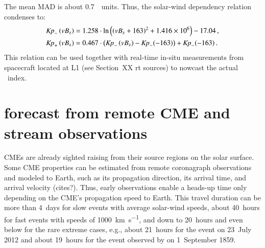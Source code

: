 \begin{figure}
\end{figure}
The mean MAD is about 0.7~\Kp{}~units. Thus, the solar-wind dependency relation condenses to:
\begin{align}
	\text{\textit{Kp}}_-\left(vB_\text{z}\right) &= 1.258 \cdot \ln\left(\left(vB_\text{z} + 163\right)^2 + \num{1.416e6}\right) - 17.04	\,,	\label{eq:kpvsvbz_dependency_function_negative}\\
	\text{\textit{Kp}}_+\left(vB_\text{z}\right) &= 0.467 \cdot \left(\text{\textit{Kp}}_-\left(vB_\text{z}\right) - \text{\textit{Kp}}_-(-163)\right) + \text{\textit{Kp}}_-(-163)	\,.	\label{eq:kpvsvbz_dependency_function_positive}
\end{align}
This relation can be used together with real-time in-situ measurements from spacecraft located at L1 (see Section~XX rt sources) to nowcast the actual \Kp~index.


\section{\Kp{} forecast from remote CME and stream observations}
\label{sec:kp_forecast}
CMEs are already sighted raising from their source regions on the solar surface. Some CME properties can be estimated from remote coronagraph observations and modeled to Earth, such as its propagation direction, its arrival time, and arrival velocity (cites?). Thus, early observations enable a heads-up time only depending on the CME's propagation speed to Earth. This travel duration can be more than 4~days for slow events with average solar-wind speeds, about 40~hours for fast events with speeds of \SI{1000}{\km\per\s}, and down to 20~hours and even below for the rare extreme cases, e.g., about 21~hours for the event on 23~July 2012 \citep{Russell2013,Temmer2015} and about 19~hours for the event observed by \citet{Carrington1859} on 1~September 1859.

